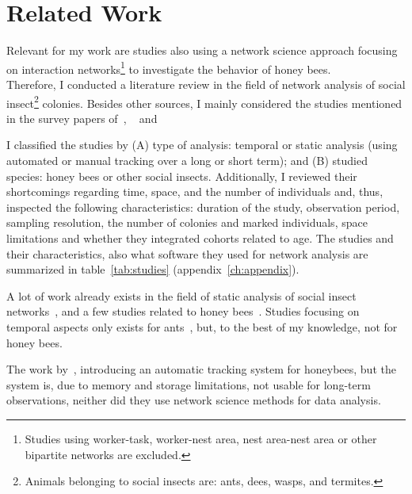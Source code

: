 \chapter{Related Work}
\label{ch:relatedwork}

Relevant for my work are studies also using a network science approach focusing on interaction networks\footnote{Studies using worker-task, worker-nest area, nest area-nest area or other bipartite networks are excluded.} to investigate the behavior of honey bees.\\
Therefore, I conducted a literature review in the field of network analysis of social insect\footnote{Animals belonging to social insects are: ants, dees, wasps, and termites.} colonies.
Besides other sources, I mainly considered the studies mentioned in the survey papers of~\textcite{Pinter-Wollman2014}, ~\textcite[chapter~15]{krause2014animal} and~\textcite{charbonneau2013social}

I classified the studies by (A) type of analysis: temporal or static analysis (using automated or manual tracking over a long or short term); and (B) studied species: honey bees or other social insects.
Additionally, I reviewed their shortcomings regarding time, space, and the number of individuals and, thus, inspected the following characteristics: duration of the study, observation period, sampling resolution, the number of colonies and marked individuals, space limitations and whether they integrated cohorts related to age. The studies and their characteristics, also what software they used for network analysis are summarized in table~\ref{tab:studies} (appendix~\ref{ch:appendix}).

A lot of work already exists in the field of static analysis of social insect networks~\cite{greenwald2015ant,pinter2011effect,otterstatter2007contact,quevillon2015social,naug2009structure,formica2012fitness,waters2012information,sendova2010emergency}, and a few studies related to honey bees~\cite{baracchi2014socio,naug2008structure,scholl2011olfactory,naug2007experimentally}.
Studies focusing on temporal aspects only exists for ants~\cite{mersch2013tracking,blonder2011time,jeanson2012long}, but, to the best of my knowledge, not for honey bees.

The work by~\textcite{kimura2011new}, introducing an automatic tracking system for honeybees, but the system is, due to memory and storage limitations, not usable for long-term observations, neither did they use network science methods for data analysis.

